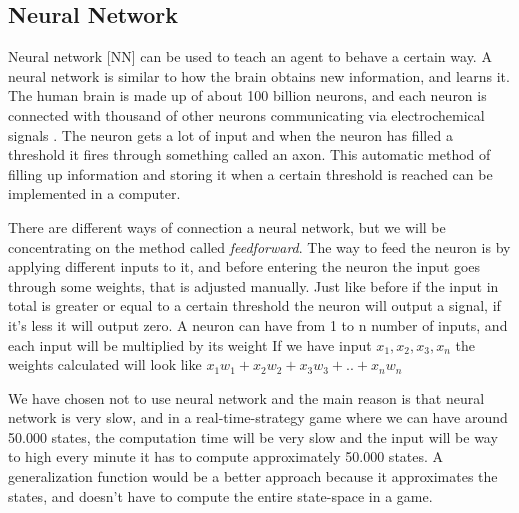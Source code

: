 			





\subsection{Neural Network}			 
			

Neural network [NN] can be used to teach an agent to behave a certain way.
A neural network is similar to how the brain obtains new information, and learns it. The human brain is made up of about 100 billion neurons, and each neuron is connected with thousand of other neurons communicating via electrochemical signals \cite{nn}. The neuron gets a lot of input and when the neuron has filled a threshold it fires through something called an axon. This automatic method of filling up information and storing it when a certain threshold is reached can be implemented in a computer.



There are different ways of connection a neural network, but we will be concentrating on the method called \textit{feedforward}. The way to feed the neuron is by applying different inputs to it, and before entering the neuron the input goes through some weights, that is adjusted manually. Just like before if the input in total is greater or equal to a certain threshold the neuron will output a signal, if it's less it will output zero.
A neuron can have from 1 to n number of inputs, and each input will be multiplied by its weight
If we have input $x_1, x_2, x_3, x_n$ the weights calculated will look like $x_1 w_1 + x_2 w_2 + x_3 w_3 + .. +  x_n w_n$


We have chosen not to use neural network and the main reason is that neural network is very slow, and in a real-time-strategy game where we can have around 50.000 states, the computation time will be very slow and the input will be way to high every minute it has to compute approximately 50.000 states. A generalization function would be a better approach because it approximates the states, and doesn't have to compute the entire state-space in a game. 
